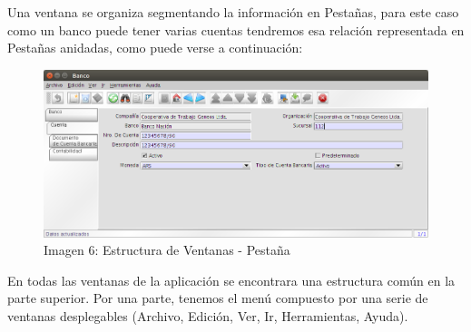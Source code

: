 \documentclass[letterpaper,10pt,spanish]{sphinxmanual}
\begin{document}
Una ventana se organiza segmentando la información en Pestañas, para este caso como un banco puede tener varias cuentas tendremos esa relación representada en Pestañas anidadas, como puede verse a continuación:
\begin{figure}[htbp]
\centering
\capstart

\includegraphics{ly_cuenta.png}
\caption{Imagen 6: Estructura de Ventanas - Pestaña}\end{figure}

En todas las ventanas de la aplicación se encontrara una estructura común en la parte superior. Por una parte, tenemos el menú compuesto por una serie de ventanas desplegables (Archivo, Edición, Ver, Ir, Herramientas, Ayuda).
\end{document}
